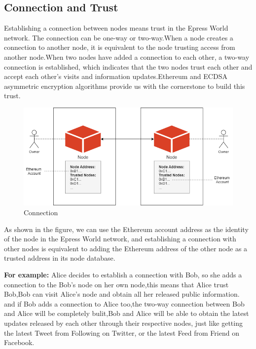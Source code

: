\documentclass{article}
\begin{document}
\subsection{Connection and Trust}
    Establishing a connection between nodes means trust in the Epress World network. The connection can be one-way or two-way.When a node creates a connection to another node, it is equivalent to the node trusting access from another node.When two nodes have added a connection to each other, a two-way connection is established, which indicates that the two nodes trust each other and accept each other's visits and information updates.Ethereum and ECDSA asymmetric encryption algorithms provide us with the cornerstone to build this trust.

    \begin{figure}[H]
        \centering
        \includegraphics[width=\textwidth]{figures-connect.png}
        \caption{Connection}
    \end{figure}

    As shown in the figure, we can use the Ethereum account address as the identity of the node in the Epress World network, and establishing a connection with other nodes is equivalent to adding the Ethereum address of the other node as a trusted address in its node database.
    ~\newline
    \begin{blockqt}
    \textbf{For example: }Alice decides to establish a connection with Bob, so she adds a connection to the Bob's node on her own node,this means that Alice trust Bob,Bob can visit Alice's node and obtain all her released public information. and if Bob adds a connection to Alice too,the two-way connection between Bob and Alice will be completely bulit,Bob and Alice will be able to obtain the latest updates released by each other through their respective nodes, just like getting the latest Tweet from Following on Twitter, or the latest Feed from Friend on Facebook.
    \end{blockqt}
\end{document}
